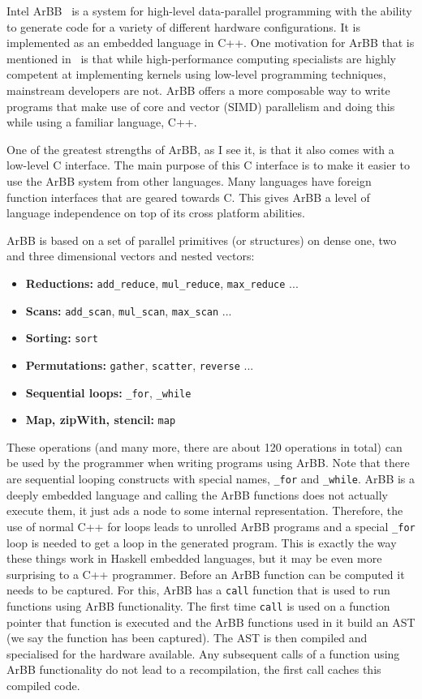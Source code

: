 \documentclass[a4paper]{book}
\begin{document}
Intel ArBB~\citet{ARBB2011} is a system for high-level data-parallel programming with the 
ability to generate code for a variety of different hardware configurations. It is implemented 
as an embedded language in C++. One motivation for ArBB that is mentioned in~\citet{ARBB2011} is 
that while high-performance computing specialists are highly competent at implementing 
kernels using low-level programming techniques, mainstream developers are not. ArBB offers 
a more composable way to write programs that make use of core and vector (SIMD) parallelism and 
doing this while using a familiar language, C++.  

One of the greatest strengths of ArBB, as I see it, is that it also comes with a low-level C 
interface. The main purpose of this C interface is to make it easier to use the ArBB system 
from other languages. Many languages have foreign function interfaces that are geared towards C.
This gives ArBB a level of language independence on top of its cross platform abilities.  


ArBB is based on a set of parallel primitives (or structures) on dense one, two and three dimensional vectors and nested vectors: 
\begin{itemize} 
\item {\bf Reductions:}   {\tt add\_reduce}, {\tt mul\_reduce}, {\tt max\_reduce} ... 
\item {\bf Scans:}        {\tt add\_scan}, {\tt mul\_scan}, {\tt max\_scan} ... 
\item {\bf Sorting:}      {\tt sort} 
\item {\bf Permutations:} {\tt gather}, {\tt scatter}, {\tt reverse} ...
\item {\bf Sequential loops:} {\tt \_for}, {\tt \_while} 
\item {\bf Map, zipWith, stencil:}  {\tt map} 
\end{itemize}

These operations (and many more, there are about 120 operations in total) can be used 
by the programmer when writing programs using ArBB. Note that there are sequential looping 
constructs with special names, {\tt \_for} and {\tt \_while}. ArBB is a deeply embedded 
language and calling the ArBB functions does not actually execute them, it just ads a node to 
some internal representation. Therefore, the use of normal C++ for loops leads to unrolled 
ArBB programs and a special {\tt \_for} loop is needed to get a loop in the generated program. 
This is exactly the way these things work in Haskell embedded languages, but it may be even 
more surprising to a C++ programmer. Before an ArBB function can be computed it needs to be 
captured. For this, ArBB has a {\tt call} function that is used to run functions using ArBB 
functionality. The first time {\tt call} is used on a function pointer that function is 
executed and the ArBB functions used in it build an AST (we say the function has been 
captured). The AST is then compiled and specialised for the hardware available. Any 
subsequent calls of a function using ArBB functionality do not lead to a recompilation, 
the first call caches this compiled code. 
\end{document}
